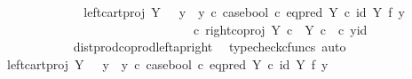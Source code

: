 \begin{isabellebody}
\ \ \ \ \ \ \ \ \ \ \isamarkupfalse%
\ \isamarkupfalse%
\ {\isachardoublequoteopen}{\isachardot}{\kern0pt}{\isachardot}{\kern0pt}{\isachardot}{\kern0pt}\ {\isacharequal}{\kern0pt}\ {\isacharparenleft}{\kern0pt}left{\isacharunderscore}{\kern0pt}cart{\isacharunderscore}{\kern0pt}proj\ Y\ {\isasymone}\ {\isasymamalg}\ {\isacharparenleft}{\kern0pt}{\isacharparenleft}{\kern0pt}y{}\ {\isasymamalg}\ y{}{\isacharparenright}{\kern0pt}\ {\isasymcirc}\isactrlsub c\ case{\isacharunderscore}{\kern0pt}bool\ {\isasymcirc}\isactrlsub c\ eq{\isacharunderscore}{\kern0pt}pred\ Y\ {\isasymcirc}\isactrlsub c\ {\isacharparenleft}{\kern0pt}id\ Y\ {\isasymtimes}\isactrlsub f\ y{}{\isacharparenright}{\kern0pt}{\isacharparenright}{\kern0pt}{\isacharparenright}{\kern0pt}\isanewline
\ \ \ \ \ \ \ \ \ \ \ \ \ \ \ \ \ \ \ \ \ \ \ \ \ \ \ \ \ \ \ \ \ {\isasymcirc}\isactrlsub c\ right{\isacharunderscore}{\kern0pt}coproj\ {\isacharparenleft}{\kern0pt}Y\ {\isasymtimes}\isactrlsub c\ {\isasymone}{\isacharparenright}{\kern0pt}\ {\isacharparenleft}{\kern0pt}Y\ {\isasymtimes}\isactrlsub c\ {\isasymone}{\isacharparenright}{\kern0pt}\ {\isasymcirc}\isactrlsub c\ {\isasymlangle}y{\isacharcomma}{\kern0pt}id\ {\isasymone}{\isasymrangle}{\isachardoublequoteclose}\isanewline
\ \ \ \ \ \ \ \ \ \ \ \ \isamarkupfalse%
\ dist{\isacharunderscore}{\kern0pt}prod{\isacharunderscore}{\kern0pt}coprod{\isacharunderscore}{\kern0pt}left{\isacharunderscore}{\kern0pt}ap{\isacharunderscore}{\kern0pt}right\ \isamarkupfalse%
\ {\isacharparenleft}{\kern0pt}typecheck{\isacharunderscore}{\kern0pt}cfuncs{\isacharcomma}{\kern0pt}\ auto{\isacharparenright}{\kern0pt}\isanewline
\ \ \ \ \ \ \ \ \ \ \isamarkupfalse%
\ \isamarkupfalse%
\ {\isachardoublequoteopen}{\isachardot}{\kern0pt}{\isachardot}{\kern0pt}{\isachardot}{\kern0pt}\ {\isacharequal}{\kern0pt}\ {\isacharparenleft}{\kern0pt}{\isacharparenleft}{\kern0pt}left{\isacharunderscore}{\kern0pt}cart{\isacharunderscore}{\kern0pt}proj\ Y\ {\isasymone}\ {\isasymamalg}\ {\isacharparenleft}{\kern0pt}{\isacharparenleft}{\kern0pt}y{}\ {\isasymamalg}\ y{}{\isacharparenright}{\kern0pt}\ {\isasymcirc}\isactrlsub c\ case{\isacharunderscore}{\kern0pt}bool\ {\isasymcirc}\isactrlsub c\ eq{\isacharunderscore}{\kern0pt}pred\ Y\ {\isasymcirc}\isactrlsub c\ {\isacharparenleft}{\kern0pt}id\ Y\ {\isasymtimes}\isactrlsub f\ y{}{\isacharparenright}{\kern0pt}{\isacharparenright}{\kern0pt}{\isacharparenright}{\kern0pt}\ \isanewline

\end{isabellebody}
